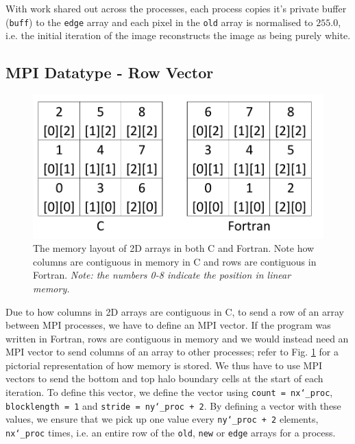 \documentclass[11pt, a4paper]{article}
\begin{document}
			With work shared out across the processes, each process copies it's private buffer (\texttt{buff}) to the \texttt{edge} array and each pixel in the \texttt{old} array is normalised to $255.0$, i.e. the initial iteration of the image reconstructs the image as being purely white.
	
		\subsection{MPI Datatype - Row Vector} \label{sect:row_vector}
				\begin{figure}
					\centering
					\includegraphics[scale=0.4]{memory_layout.png}
					\caption{The memory layout of 2D arrays in both C and Fortran. Note how columns are contiguous in memory in C and rows are contiguous in Fortran. \textit{Note: the numbers 0-8 indicate the position in linear memory.}}
					\label{fig:memory_layout}
				\end{figure}
				
			Due to how columns in 2D arrays are contiguous in C, to send a row of an array between MPI processes, we have to define an MPI vector. If the program was written in Fortran, rows are contiguous in memory and we would instead need an MPI vector to send columns of an array to other processes; refer to Fig. \ref{fig:memory_layout} for a pictorial representation of how memory is stored. We thus have to use MPI vectors to send the bottom and top halo boundary cells at the start of each iteration. To define this vector, we define the vector using \texttt{count = nx\char`_proc}, \texttt{blocklength = 1} and \texttt{stride = ny\char`_proc + 2}. By defining a vector with these values, we ensure that we pick up one value every \texttt{ny\char`_proc + 2} elements, \texttt{nx\char`_proc} times, i.e. an entire row of the \texttt{old}, \texttt{new} or \texttt{edge} arrays for a process.	
				
\end{document}
